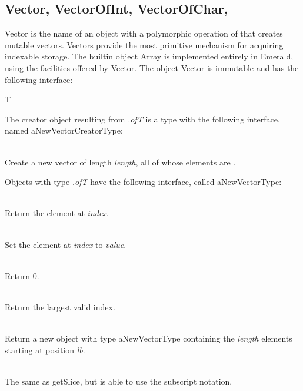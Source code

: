 \subsection{Vector, VectorOfInt, VectorOfChar, }
\label{builtin Vector}
Vector is the name of an object with a polymorphic operation of that creates
mutable vectors.  Vectors provide the most
primitive mechanism for acquiring indexable storage.  The builtin
object Array is implemented entirely in Emerald, using the facilities
offered by Vector.  The object Vector is immutable and has the following
interface: 

\begin{desc}
  \item[\kw{function} of\/\LB{}T \CO{} \tn{Type}\/\RB{} \returns{} \/\LB{}aNewVectorCreatorType\/\RB{}]
     T
\end{desc}

\noindent The creator object resulting from {\it {}.of\/\LB{}T\/\RB{}}
is a type with the following interface, named aNewVectorCreatorType:

\begin{desc}
  \item[\kw{operation} create\/\LB{}length \CO{} \tn{Integer}\/\RB{} \returns{} \/\LB{}aNewVectorType\/\RB{}]~\\
    Create a new vector of length {\it length}, all of whose elements are
    . 
\end{desc}

\noindent Objects with type {\it {}.of\/\LB{}T\/\RB{}} have the
following interface, called aNewVectorType:

\begin{desc}
  \item[\kw{function}  getElement\/\LB{}index \CO{} \tn{Integer}\/\RB{} \returns{} \/\LB{}T\/\RB{}]~\\
    Return the element at {\it index}.
  \item[\kw{operation} setElement\/\LB{}index \CO{} \tn{Integer}, value \CO{} T\/\RB{}]~\\
    Set the element at {\it index} to {\it value}.
  \item[\kw{function}  lowerbound \returns{} \/\LB{}\tn{Integer}\/\RB{}]~\\
    Return 0.
  \item[\kw{function}  upperbound \returns{} \/\LB{}\tn{Integer}\/\RB{}]~\\
    Return the largest valid index.
  \item[\kw{function}  getSlice\/\LB{}lb \CO{} \tn{Integer}, length\CO{} \tn{Integer}\/\RB{} \returns{} \/\LB{}aNewVectorType\/\RB{}]~\\
    Return a new object with type aNewVectorType containing the {\it length}
    elements starting at position {\it lb}.
  \item[\kw{function}  getElement\/\LB{}lb \CO{} \tn{Integer}, length\CO{} \tn{Integer}\/\RB{} \returns{} \/\LB{}aNewVectorType\/\RB{}]~\\
    The same as getSlice, but is able to use the subscript notation.
\end{desc}

